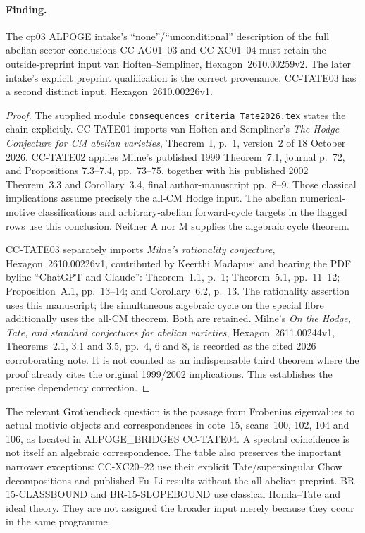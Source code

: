 \paragraph{Finding.}
The cp03 ALPOGE intake's ``none''/``unconditional'' description of the
full abelian-sector conclusions CC-AG01--03 and CC-XC01--04 must retain
the outside-preprint input van Hoften--Sempliner,
Hexagon~2610.00259v2.  The later intake's explicit preprint qualification
is the correct provenance.  CC-TATE03 has a second distinct input,
Hexagon~2610.00226v1.

\begin{proof}
The supplied module \texttt{consequences\_criteria\_Tate2026.tex}
states the chain explicitly.  CC-TATE01 imports van Hoften and
Sempliner's \emph{The Hodge Conjecture for CM abelian varieties},
Theorem~I, p.~1, version~2 of 18 October 2026.  CC-TATE02 applies
Milne's published 1999 Theorem~7.1, journal p.~72, and Propositions
7.3--7.4, pp.~73--75, together with his published 2002 Theorem~3.3
and Corollary~3.4, final author-manuscript pp.~8--9.  Those classical
implications assume precisely the all-CM Hodge input.  The abelian
numerical-motive classifications and arbitrary-abelian forward-cycle
targets in the flagged rows use this conclusion.  Neither A nor M
supplies the algebraic cycle theorem.

CC-TATE03 separately imports \emph{Milne's rationality conjecture},
Hexagon~2610.00226v1, contributed by Keerthi Madapusi and bearing the
PDF byline ``ChatGPT and Claude'': Theorem~1.1, p.~1;
Theorem~5.1, pp.~11--12; Proposition~A.1, pp.~13--14; and
Corollary~6.2, p.~13.  The rationality assertion uses this manuscript;
the simultaneous algebraic cycle on the special fibre additionally
uses the all-CM theorem.  Both are retained.  Milne's
\emph{On the Hodge, Tate, and standard conjectures for abelian
varieties}, Hexagon~2611.00244v1, Theorems~2.1, 3.1 and 3.5,
pp.~4, 6 and 8, is recorded as the cited 2026 corroborating note.
It is not counted as an indispensable third theorem where the proof
already cites the original 1999/2002 implications.  This establishes
the precise dependency correction.
\end{proof}

The relevant Grothendieck question is the passage from Frobenius
eigenvalues to actual motivic objects and correspondences in cote~15,
scans~100, 102, 104 and 106, as located in ALPOGE\_BRIDGES
CC-TATE04.  A spectral coincidence is not itself an algebraic
correspondence.  The table also preserves the important narrower
exceptions: CC-XC20--22 use their explicit Tate/supersingular Chow
decompositions and published Fu--Li results without the all-abelian
preprint.  BR-15-CLASSBOUND and BR-15-SLOPEBOUND use classical
Honda--Tate and ideal theory.  They are not assigned the broader input
merely because they occur in the same programme.


